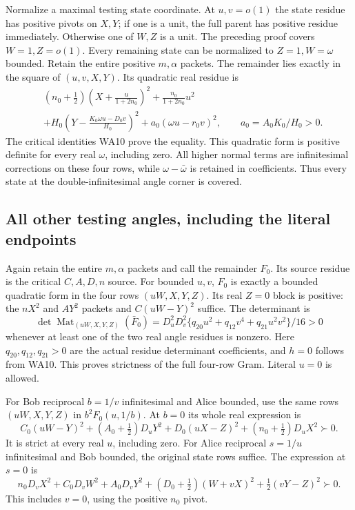 Normalize a maximal testing state coordinate. At \(u,v=o(1)\)
the state residue has positive pivots on \(X,Y\); if one is a unit,
the full parent has positive residue immediately. Otherwise one
of \(W,Z\) is a unit. The preceding proof covers \(W=1,Z=o(1)\).
Every remaining state can be normalized to \(Z=1,W=\omega\)
bounded. Retain the entire positive \(m,\alpha\) packets.
The remainder lies exactly in the square of \((u,v,X,Y)\).
Its quadratic real residue is
\[
\begin{aligned}
 &(n_0+\tfrac12)\left(X+\frac{u}{1+2n_0}\right)^2
     +\frac{n_0}{1+2n_0}u^2\\
 &+H_0\left(Y-\frac{K_0\omega u-D_0v}{H_0}\right)^2
     +a_0(\omega u-r_0v)^2,\qquad a_0=A_0K_0/H_0>0 .
\end{aligned}\tag{WA22}
\]
The critical identities WA10 prove the equality. This quadratic
form is positive definite for every real \(\omega\), including zero.
All higher normal terms are infinitesimal corrections on these
four rows, while \(\omega-\bar\omega\) is retained in coefficients.
Thus every state at the double-infinitesimal angle corner is covered.

\subsection{All other testing angles, including the literal endpoints}

Again retain the entire \(m,\alpha\) packets and call the remainder
\(F_0\). Its source residue is the critical \(C,A,D,n\) source.
For bounded \(u,v\), \(F_0\) is exactly a bounded quadratic form
in the four rows \((uW,X,Y,Z)\). Its real \(Z=0\) block is positive:
the \(nX^2\) and \(AY^2\) packets and \(C(uW-Y)^2\) suffice.
The determinant is
\[
 \det \operatorname{Mat}_{(uW,X,Y,Z)}(\bar F_0)
 =D_u^2D_v^2\{q_{20}u^2+q_{12}v^4+q_{21}u^2v^2\}/16>0
 \tag{WA23}
\]
whenever at least one of the two real angle residues is nonzero.
Here \(q_{20},q_{12},q_{21}>0\) are the actual residue determinant
coefficients, and \(h=0\) follows from WA10. This proves strictness
of the full four-row Gram. Literal \(u=0\) is allowed.

For Bob reciprocal \(b=1/v\) infinitesimal and Alice bounded,
use the same rows \((uW,X,Y,Z)\) in \(b^2F_0(u,1/b)\).
At \(b=0\) its whole real expression is
\[
 C_0(uW-Y)^2+(A_0+\tfrac12)D_uY^2
             +D_0(uX-Z)^2+(n_0+\tfrac12)D_uX^2\succ0 .
 \tag{WA24}
\]
It is strict at every real \(u\), including zero.
For Alice reciprocal \(s=1/u\) infinitesimal and Bob bounded,
the original state rows suffice. The expression at \(s=0\) is
\[
 n_0D_vX^2+C_0D_vW^2+A_0D_vY^2
          +(D_0+\tfrac12)(W+vX)^2+\tfrac12(vY-Z)^2\succ0 .
 \tag{WA25}
\]
This includes \(v=0\), using the positive \(n_0\) pivot.

